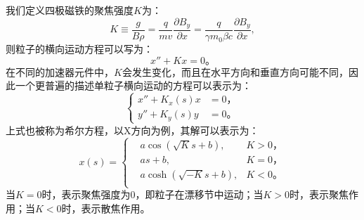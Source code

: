 我们定义四极磁铁的聚焦强度$K$为：
\begin{equation}
    \label{eq:quadrupole_force3}
    K \equiv \frac{g}{B\rho} = \frac{q}{mv}                 \frac{\partial B_y}{\partial x}
                             = \frac{q}{\gamma m_0 \beta c} \frac{\partial B_y}{\partial x},
\end{equation}
则粒子的横向运动方程可以写为：
\begin{equation}
    \label{eq:Mathier_Hill_x}
    x'' + Kx =0 \text{。}
\end{equation}
在不同的加速器元件中，$K$会发生变化，而且在水平方向和垂直方向可能不同，因此一个更普遍的描述单粒子横向运动的方程可以表示为：
\begin{equation}
    \label{eq:Mathier_Hill}
    \left\{
    \begin{aligned}
        x'' + K_x(s)x &= 0\text{，} \\
        y'' + K_y(s)y &= 0\text{。}
    \end{aligned}
    \right.
\end{equation}
上式也被称为希尔方程，以X方向为例，其解可以表示为\cite{abramowitz1964handbook}：
\begin{equation}
    \label{eq:Mathier_Hill_solver}
    x(s)=\left\{
    \begin{aligned}
        &a\cos (\sqrt{K}s+b) ,& K>0\text{，} \\
        &as+b                ,& K=0\text{，} \\
        &a\cosh(\sqrt{-K}s+b),& K<0\text{。} \\
    \end{aligned}
    \right.
\end{equation}
当$K=0$时，表示聚焦强度为0，即粒子在漂移节中运动；当$K>0$时，表示聚焦作用；当$K<0$时，表示散焦作用。

